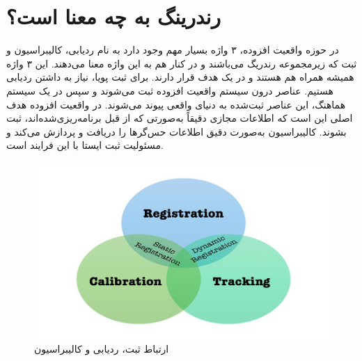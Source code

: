 \section{رندرینگ به چه معنا است؟}
در حوزه واقعیت افزوده، ۳ واژه بسیار مهم وجود دارد به نام ردیابی، کالیبراسیون و ثبت که زیرمجموعه رندریگ می‌باشند و در کنار هم به این واژه معنا می‌دهند. این ۳ واژه همیشه همراه هم هستند و در یک هدف قرار دارند. برای ثبت پویا، نیاز به داشتن ردیابی هستیم. عناصر درون سیستم واقعیت افزوده ثبت می‌شوند و سپس در یک سیستم هماهنگ، این عناصر ثبت‌شده به دنیای واقعی پیوند می‌شوند. در واقعیت افزوده هدف اصلی این است که اطلاعات مجازی دقیقاً به‌صورتی که از قبل برنامه‌ریزی‌شده‌اند، ثبت بشوند. کالیبراسیون به‌صورت دقیق اطلاعات حس‌گرها را دریافت و پردازش می‌کند و مسئولیت ثبت ایستا با این فرایند است\cite{siltanen2012theory}.
\\
\begin{figure}
	\centering
	\includegraphics[width=1\linewidth]{image/rct}
	\caption {ارتباط ثبت، ردیابی و کالیبراسیون\cite{siltanen2012theory}}
	\label{fig:rct}
\end{figure}

